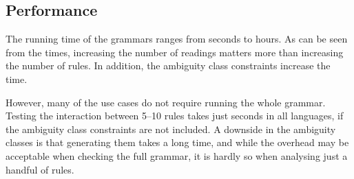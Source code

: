 \subsection{Performance} 
The running time of the grammars ranges from seconds to hours. 
As can be seen from the times, increasing the number of readings
matters more than increasing the number of rules.
In addition, the ambiguity class constraints increase the time.


However, many of the use cases do not require running the whole
grammar. Testing the interaction between 5--10 rules takes just
seconds in all languages, if the ambiguity class constraints are not included. 
A downside in the ambiguity classes is that generating them takes a long time, 
and while the overhead may be acceptable when checking the full grammar,
it is hardly so when analysing just a handful of rules.










